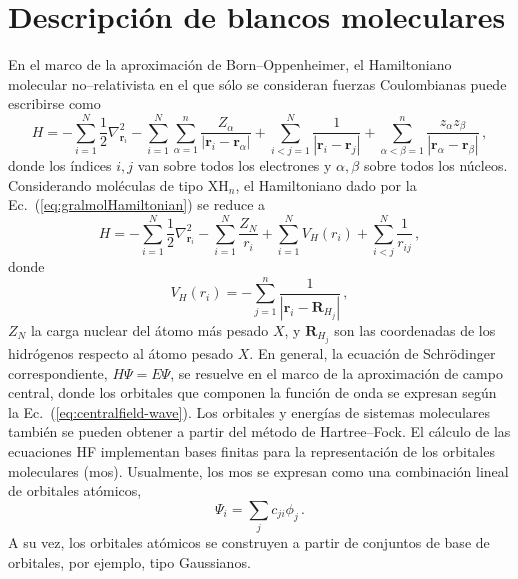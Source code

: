 \section{Descripción de blancos moleculares}
\label{sec:moleculas}

En el marco de la aproximación de Born--Oppenheimer, el Hamiltoniano 
molecular no--relativista en el que sólo se consideran fuerzas 
Coulombianas puede escribirse como
\begin{equation}
H = - \sum_{i=1}^N \frac{1}{2} \nabla^2_{\mathbf{r}_i} 
    - \sum_{i=1}^N \sum_{\alpha=1}^n \frac{Z_{\alpha}}{
    \left|\mathbf{r}_i-\mathbf{r}_{\alpha}\right|} 
    + \sum_{i<j=1}^N \frac{1}{\left|\mathbf{r}_i-\mathbf{r}_j\right|} 
    + \sum_{\alpha<\beta=1}^n \frac{z_{\alpha}z_{\beta}}{
    \left|\mathbf{r}_{\alpha}-\mathbf{r}_{\beta}\right|}\,,
\label{eq:gralmolHamiltonian}
\end{equation}
donde los índices $i,j$ van sobre todos los electrones y $\alpha,\beta$ 
sobre todos los núcleos. Considerando moléculas de tipo XH$_n$, el 
Hamiltoniano dado por la Ec.~(\ref{eq:gralmolHamiltonian}) se reduce a 
\begin{equation}
H = -\sum_{i=1}^N \frac{1}{2} \nabla^2_{\mathbf{r}_i} 
    - \sum_{i=1}^N \frac{Z_N}{r_i} 
    + \sum_{i=1}^N V_H(r_i)
    + \sum_{i<j}^N \frac{1}{r_{ij}}\,,
\label{eq:Hmol}
\end{equation}
donde
\begin{equation}
V_H(r_i)=
-\sum_{j=1}^{n} \frac{1}{\left|\mathbf{r}_i-\mathbf{R}_{H_j}\right|}\,,
\label{eq:Vhidrogenos}
\end{equation}
$Z_N$ la carga nuclear del átomo más pesado $X$, y $\mathbf{R}_{H_j}$ 
son las coordenadas de los hidrógenos respecto al átomo pesado $X$. En 
general, la ecuación de Schr\"odinger correspondiente, $H\Psi=E\Psi$, se 
resuelve en el marco de la aproximación de campo central, donde los 
orbitales que componen la función de onda se expresan según la 
Ec.~(\ref{eq:centralfield-wave}). Los orbitales y energías de sistemas 
moleculares también se pueden obtener a partir del método de 
Hartree--Fock. El cálculo de las ecuaciones HF implementan bases finitas 
para la representación de los orbitales moleculares (\acsp{mo}). 
Usualmente, los \acsp{mo} se expresan como una combinación lineal de 
orbitales atómicos, 
\begin{equation}
\Psi_i=\sum_j c_{ji} \phi_j\,.
\end{equation}
A su vez, los orbitales atómicos se construyen a partir de conjuntos de 
base de orbitales, por ejemplo, tipo Gaussianos.

